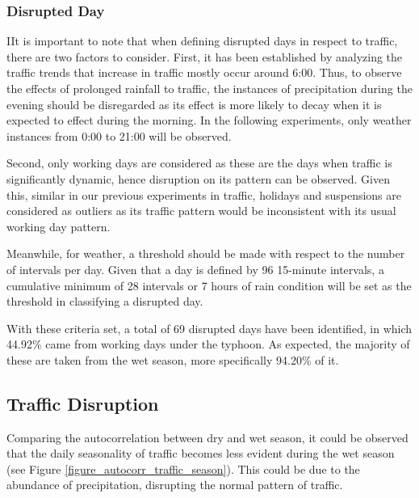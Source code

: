 

\subsubsection{Disrupted Day}

IIt is important to note that when defining disrupted days in respect to traffic, there are two factors to consider. First, it has been established by analyzing the traffic trends that increase in traffic mostly occur around 6:00. Thus, to observe the effects of prolonged rainfall to traffic, the instances of precipitation during the evening should be disregarded as its effect is more likely to decay when it is expected to effect during the morning. In the following experiments, only weather instances from 0:00 to 21:00 will be observed.

Second, only working days are considered as these are the days when traffic is significantly dynamic, hence disruption on its pattern can be observed. Given this, similar in our previous experiments in traffic, holidays and suspensions are considered as outliers as its traffic pattern would be inconsistent with its usual working day pattern.

Meanwhile, for weather, a threshold should be made with respect to the number of intervals per day. Given that a day is defined by 96 15-minute intervals, a cumulative minimum of 28 intervals or 7 hours of rain condition will be set as the threshold in classifying a disrupted day.

With these criteria set, a total of 69 disrupted days have been identified, in which 44.92\% came from working days under the typhoon. As expected, the majority of these are taken from the wet season, more specifically 94.20\% of it.


\subsection{Traffic Disruption}
Comparing the autocorrelation between dry and wet season, it could be observed that the daily seasonality of traffic becomes less evident during the wet season (see Figure \ref{figure_autocorr_traffic_season}). This could be due to the abundance of precipitation, disrupting the normal pattern of traffic.


